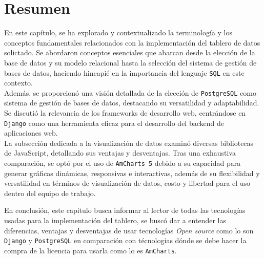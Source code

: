 \section{Resumen}




En este capítulo, se ha explorado y contextualizado la terminología y los conceptos fundamentales relacionados con la implementación del tablero de datos solictado. Se abordaron conceptos esenciales que abarcan desde la elección de la base de datos y su modelo relacional hasta la selección del sistema de gestión de bases de datos, haciendo hincapié en la importancia del lenguaje \texttt{SQL} en este contexto.\\

Además, se proporcionó una visión detallada de la elección de \texttt{PostgreSQL} como sistema de gestión de bases de datos, destacando su versatilidad y adaptabilidad. \\
Se discutió la relevancia de los frameworks de desarrollo web, centrándose en \texttt{Django} como una herramienta eficaz para el desarrollo del backend de aplicaciones web.
\\

La subsección dedicada a la visualización de datos examinó diversas bibliotecas de JavaScript, detallando sus ventajas y desventajas. Tras una exhaustiva comparación, se optó por el uso de \texttt{AmCharts 5} debido a su capacidad para generar gráficas dinámicas, responsivas e interactivas, además de su flexibilidad y versatilidad en términos de visualización de datos, costo y libertad para el uso dentro del equipo de trabajo.

En conclusión, este capitulo busca informar al lector de todas las tecnologías usadas para la implementación del tablero, se buscó dar a entender las diferencias, ventajas y desventajas de usar tecnologías \textit{Open source} como lo son \texttt{Django} y \texttt{PostgreSQL} en comparación con técnologias dónde se debe hacer la compra de la licencia para usarla como lo es \texttt{AmCharts}.